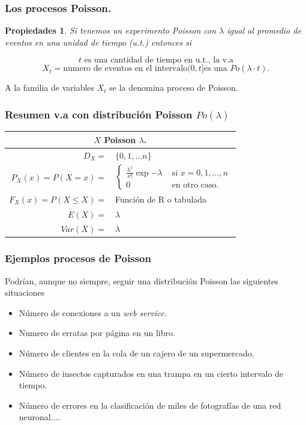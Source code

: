 \documentclass[handout]{beamer}\usepackage[]{graphicx}\usepackage[]{color}
\renewcommand{\emph}[1]{{\color{red}#1}}
\renewcommand{\leq}{\leqslant}
\theoremstyle{plain}
\newtheorem{prop}{Propiedades}
\theoremstyle{definition}
\begin{document}
\begin{frame}
\frametitle{Los procesos Poisson.}
\begin{prop}
Si tenemos un experimento \emph{Poisson}  con $\lambda$ igual
al promedio de eventos en una unidad de tiempo (u.t.) entonces si

$$ t \mbox{ es una cantidad de tiempo en u.t., la v.a}$$
$$X_{t}=\mbox{numero de eventos en el intervalo} (0,t] 
\mbox{es una } Po(\lambda\cdot t).$$
\end{prop}

  A la familia de variables $X_t$ se la denomina proceso de Poisson.
\end{frame}

\begin{frame}
\frametitle{Resumen v.a con distribución  Poisson  $Po(\lambda)$}
\scriptsize
\setlength{\tabcolsep}{1pt}
\begin{table}
\centering
\begin{tabular}{|rl|}
\hline 
\multicolumn{2}{|c|}{$X$ Poisson $\lambda$.}\\ 
\hline
\hline 
$D_X=$&  $\{0,1,\ldots n\}$ \\\hline 
$P_X(x)=P(X=x)=$ & 
$\left\{
\begin{array}{ll}
  \frac{\lambda^x}{x!}\exp{-\lambda} & \mbox{ si } x=0,1,\ldots,n\\
     0  & \mbox{ en otro caso.}
     \end{array}\right.$
\\ \hline 
$F_X(x)=P(X\leq X)=$ &  Función de R o tabulada \\\hline 
$E(X)=$ &  $\lambda$ \\
$Var(X)=$ & $\lambda$\\
\hline
\end{tabular}
\end{table}
\normalsize
\end{frame}


\begin{frame}
\frametitle{Ejemplos procesos de Poisson}
Podrían, aunque no siempre, seguir una distribución Poisson las siguientes situaciones
\begin{itemize}
\item Número de conexiones a un \textsl{web service}.
\item Numero de erratas  por página en un libro.
\item Número de clientes en la cola de un cajero de un supermercado.
\item Número de insectos capturados en una trampa en un cierto intervalo de tiempo.
\item Número de errores en la clasificación de miles de fotografías de una red neuronal....
\end{itemize}
\end{frame}
\end{document}
